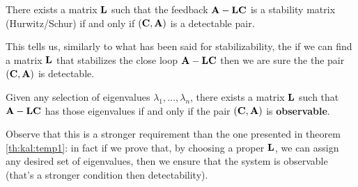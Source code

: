 	\begin{theorem} \label{th:kal:temp1}
		There exists a matrix $\mathbf{L}$ such that the feedback $\mathbf{A}-\mathbf{L}\mathbf{C}$ is a stability matrix (Hurwitz/Schur) if and only if $(\mathbf{C},\mathbf{A})$ is a detectable pair.
	\end{theorem}
	This tells us, similarly to what has been said for stabilizability, the if we can find a matrix $\mathbf{L}$ that stabilizes the close loop $\mathbf{A}-\mathbf{L}\mathbf{C}$ then we are sure the the pair $(\mathbf{C},\mathbf{A})$ is detectable.

	\begin{theorem}
		Given any selection of eigenvalues $\lambda_1,\dots, \lambda_n$, there exists a matrix $\mathbf{L}$ such that $\mathbf{A}-\mathbf{L}\mathbf{C}$ has those eigenvalues if and only if the pair $(\mathbf{C},\mathbf{A})$ is \textbf{observable}.
	\end{theorem}
	Observe that this is a stronger requirement than the one presented in theorem \ref{th:kal:temp1}: in fact if we prove that, by choosing a proper $\mathbf{L}$, we can assign any desired set of eigenvalues, then we ensure that the system is observable (that's a stronger condition then detectability).
	
